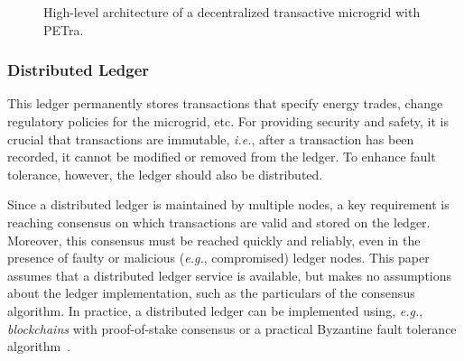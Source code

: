 \begin{figure}[h!]
\center
{}
\caption{High-level architecture of a decentralized transactive microgrid with PETra.}
\label{fig:softwareArchitecture}
\end{figure}

\subsubsection{Distributed Ledger}
This ledger permanently stores transactions that specify energy
trades, change regulatory policies for the microgrid, etc.  For
providing security and safety, it is crucial that transactions are
immutable, \emph{i.e.}, after a transaction has been recorded, it
cannot be modified or removed from the ledger.  To enhance fault
tolerance, however, the ledger should also be distributed.

Since a distributed ledger is maintained by multiple nodes, a key
requirement is reaching consensus on which transactions are valid and
stored on the ledger.  Moreover, this consensus must be reached
quickly and reliably, even in the presence of faulty or malicious
(\emph{e.g.}, compromised) ledger nodes.  This paper assumes that a
distributed ledger service is available, but makes no assumptions
about the ledger implementation, such as the particulars of the
consensus algorithm.  In practice, a distributed ledger can be
implemented using, \emph{e.g.}, \emph{blockchains} with proof-of-stake
consensus or a practical Byzantine fault tolerance
algorithm~\cite{castro1999practical}.

